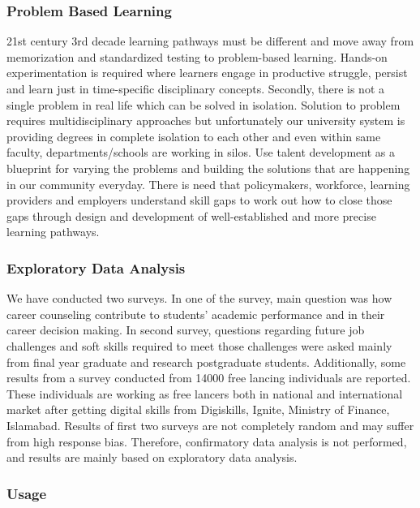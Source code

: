 \documentclass[]{elsarticle} %
\begin{document}
\hypertarget{problem-based-learning}{%
\subsubsection{Problem Based Learning}\label{problem-based-learning}}

21st century 3rd decade learning pathways must be different and move
away from memorization and standardized testing to problem-based
learning. Hands-on experimentation is required where learners engage in
productive struggle, persist and learn just in time-specific
disciplinary concepts. Secondly, there is not a single problem in real
life which can be solved in isolation. Solution to problem requires
multidisciplinary approaches but unfortunately our university system is
providing degrees in complete isolation to each other and even within
same faculty, departments/schools are working in silos. Use talent
development as a blueprint for varying the problems and building the
solutions that are happening in our community everyday. There is need
that policymakers, workforce, learning providers and employers
understand skill gaps to work out how to close those gaps through design
and development of well-established and more precise learning pathways.

\hypertarget{exploratory-data-analysis}{%
\subsubsection{Exploratory Data
Analysis}\label{exploratory-data-analysis}}

We have conducted two surveys. In one of the survey, main question was
how career counseling contribute to students' academic performance and
in their career decision making. In second survey, questions regarding
future job challenges and soft skills required to meet those challenges
were asked mainly from final year graduate and research postgraduate
students. Additionally, some results from a survey conducted from 14000
free lancing individuals are reported. These individuals are working as
free lancers both in national and international market after getting
digital skills from Digiskills, Ignite, Ministry of Finance, Islamabad.
Results of first two surveys are not completely random and may suffer
from high response bias. Therefore, confirmatory data analysis is not
performed, and results are mainly based on exploratory data analysis.

\hypertarget{usage}{%
\subsubsection{Usage}\label{usage}}
\end{document}
